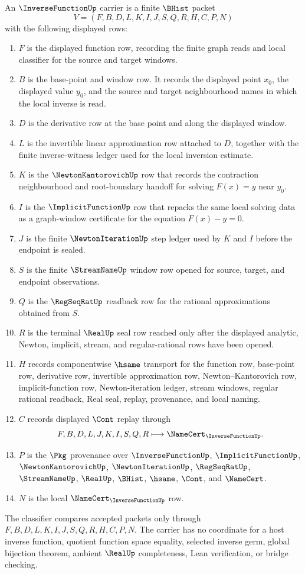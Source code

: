 \begin{definition}\label{def:inverse-function-carrier}
An $\InverseFunctionUp$ carrier is a finite $\BHist$ packet
$$
V=(F,B,D,L,K,I,J,S,Q,R,H,C,P,N)
$$
with the following displayed rows:
\begin{enumerate}
\item $F$ is the displayed function row, recording the finite graph reads and local classifier for the source and target windows.
\item $B$ is the base-point and window row. It records the displayed point $x_0$, the displayed value $y_0$, and the source and target neighbourhood names in which the local inverse is read.
\item $D$ is the derivative row at the base point and along the displayed window.
\item $L$ is the invertible linear approximation row attached to $D$, together with the finite inverse-witness ledger used for the local inversion estimate.
\item $K$ is the $\NewtonKantorovichUp$ row that records the contraction neighbourhood and root-boundary handoff for solving $F(x)=y$ near $y_0$.
\item $I$ is the $\ImplicitFunctionUp$ row that repacks the same local solving data as a graph-window certificate for the equation $F(x)-y=0$.
\item $J$ is the finite $\NewtonIterationUp$ step ledger used by $K$ and $I$ before the endpoint is sealed.
\item $S$ is the finite $\StreamNameUp$ window row opened for source, target, and endpoint observations.
\item $Q$ is the $\RegSeqRatUp$ readback row for the rational approximations obtained from $S$.
\item $R$ is the terminal $\RealUp$ seal row reached only after the displayed analytic, Newton, implicit, stream, and regular-rational rows have been opened.
\item $H$ records componentwise $\hsame$ transport for the function row, base-point row, derivative row, invertible approximation row, Newton--Kantorovich row, implicit-function row, Newton-iteration ledger, stream windows, regular rational readback, Real seal, replay, provenance, and local naming.
\item $C$ records displayed $\Cont$ replay through
$$
F,B,D,L,J,K,I,S,Q,R \longmapsto \NameCert_{\InverseFunctionUp}.
$$
\item $P$ is the $\Pkg$ provenance over $\InverseFunctionUp$, $\ImplicitFunctionUp$, $\NewtonKantorovichUp$, $\NewtonIterationUp$, $\RegSeqRatUp$, $\StreamNameUp$, $\RealUp$, $\BHist$, $\hsame$, $\Cont$, and $\NameCert$.
\item $N$ is the local $\NameCert_{\InverseFunctionUp}$ row.
\end{enumerate}
The classifier compares accepted packets only through $F,B,D,L,K,I,J,S,Q,R,H,C,P,N$. The carrier has no coordinate for a host inverse function, quotient function space equality, selected inverse germ, global bijection theorem, ambient $\RealUp$ completeness, Lean verification, or bridge checking.
\end{definition}
